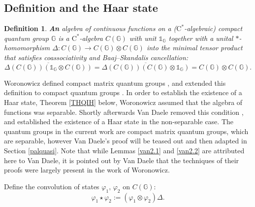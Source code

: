 \documentclass[12pt]{amsart}
\newtheorem{definition}[theorem]{Definition}
\theoremstyle{remark}
\theoremstyle{remark}
\begin{document}
\subsection{Definition and the Haar state}
\begin{definition}
\textbf{An} \emph{algebra of continuous functions on a ($\mathrm{C}^*$-algebraic) compact quantum group} $\mathbb{G}$ is a $\mathrm{C}^*$-algebra $C(\mathbb{G})$ with unit $\mathds{1}_{\mathbb{G}}$ together with a unital $\ast$-homomorphism  $\Delta:C(\mathbb{G})\to C(\mathbb{G})\otimes C(\mathbb{G})$ into the minimal tensor product that satisfies coassociativity and \emph{Baaj--Skandalis cancellation}:
 $$\overline{\Delta(C(\mathbb{G}))(\mathds{1}_{\mathbb{G}}\otimes C(\mathbb{G}))}=\overline{\Delta(C(\mathbb{G}))(C(\mathbb{G})\otimes \mathds{1}_{\mathbb{G}})}=C(\mathbb{G})\otimes C(\mathbb{G}).$$
\end{definition}
Woronowicz defined compact matrix quantum groups \cite{wo1}, and extended this definition to compact quantum groups \cite{wo3}. In order to establish the existence of a Haar state, Theorem \ref{THQIH} below, Woronowicz assumed that the algebra of functions was separable. Shortly afterwards Van Daele removed this condition \cite{van}, and established the existence of a Haar state in the non-separable case. The quantum groups in the current work are compact matrix quantum groups, which are separable, however Van Daele's proof will be teased out  and then adapted in Section \ref{palquasi}. Note that while Lemmas \ref{van2.1} and \ref{van2.2} are attributed here to Van Daele, it is pointed out by Van Daele that the techniques of their proofs  were largely present in the work of Woronowicz.


\bigskip

Define the convolution of states $\varphi_1,\,\varphi_2$ on $C(\mathbb{G})$:
$$\varphi_1\star \varphi_2:=(\varphi_1\otimes\varphi_2)\Delta.$$
\end{document}

